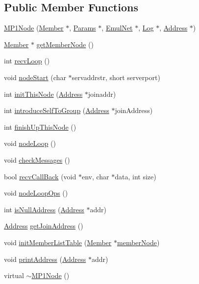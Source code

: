 \subsection*{Public Member Functions}
\begin{DoxyCompactItemize}
\item 
\hyperlink{class_m_p1_node_a7ee5f216f4d59ee4e80028f346a71e80}{M\+P1\+Node} (\hyperlink{class_member}{Member} $\ast$, \hyperlink{class_params}{Params} $\ast$, \hyperlink{class_emul_net}{Emul\+Net} $\ast$, \hyperlink{class_log}{Log} $\ast$, \hyperlink{class_address}{Address} $\ast$)
\item 
\hyperlink{class_member}{Member} $\ast$ \hyperlink{class_m_p1_node_acf056a183e4db1b8290ff736f8ced409}{get\+Member\+Node} ()
\item 
int \hyperlink{class_m_p1_node_a61c78c68e9033a5ff52c3fc2e1a3982b}{recv\+Loop} ()
\item 
void \hyperlink{class_m_p1_node_a432c95b8d9ff4d689bf6f670884639a8}{node\+Start} (char $\ast$servaddrstr, short serverport)
\item 
int \hyperlink{class_m_p1_node_ae2b5a0e2ffd68532ab68a1f17853cf6e}{init\+This\+Node} (\hyperlink{class_address}{Address} $\ast$joinaddr)
\item 
int \hyperlink{class_m_p1_node_ad020c60f48dec0571ce9a744540effbd}{introduce\+Self\+To\+Group} (\hyperlink{class_address}{Address} $\ast$join\+Address)
\item 
int \hyperlink{class_m_p1_node_a707677bbd17a3cf3d441f0ab08dab6b7}{finish\+Up\+This\+Node} ()
\item 
void \hyperlink{class_m_p1_node_a5580b634a7656f04db9d819d0b722712}{node\+Loop} ()
\item 
void \hyperlink{class_m_p1_node_a4fe0fab29863fb7de566e9361272d0ad}{check\+Messages} ()
\item 
bool \hyperlink{class_m_p1_node_ac04abd96cbe4d9c34cb9b1b775b82511}{recv\+Call\+Back} (void $\ast$env, char $\ast$data, int size)
\item 
void \hyperlink{class_m_p1_node_a1dcede441149fb1dc09b0ef9cf715ca8}{node\+Loop\+Ops} ()
\item 
int \hyperlink{class_m_p1_node_aa602659d4955d5656fac098d6caf43a9}{is\+Null\+Address} (\hyperlink{class_address}{Address} $\ast$addr)
\item 
\hyperlink{class_address}{Address} \hyperlink{class_m_p1_node_aaf969b40dbcd84f9cf71976463d397f2}{get\+Join\+Address} ()
\item 
void \hyperlink{class_m_p1_node_af86b48cb1dfa2ecfceb72c48f584e498}{init\+Member\+List\+Table} (\hyperlink{class_member}{Member} $\ast$\hyperlink{class_m_p1_node_a328d012a8827407b51ea765ee420b8a3}{member\+Node})
\item 
void \hyperlink{class_m_p1_node_a9d17887a03711ecab55cc0af4777985c}{print\+Address} (\hyperlink{class_address}{Address} $\ast$addr)
\item 
virtual \hyperlink{class_m_p1_node_aec6ac10280043ed4e078b9d9d2725eb9}{$\sim$\+M\+P1\+Node} ()
\end{DoxyCompactItemize}
